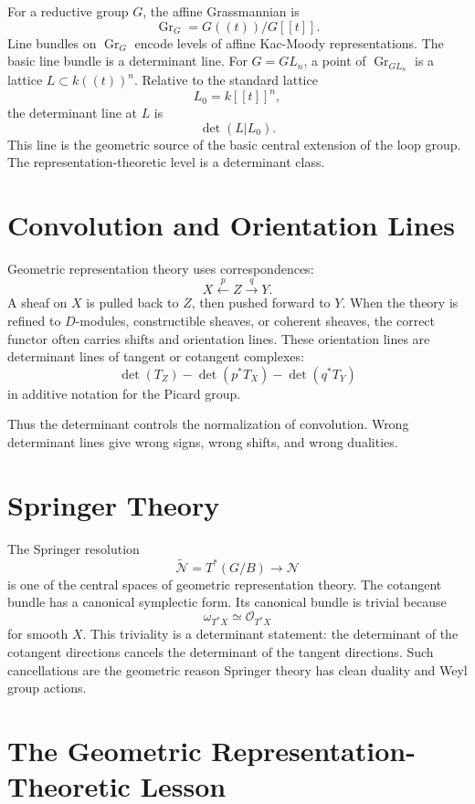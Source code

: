 \documentclass[11pt]{memoir}
\newcommand{\cO}{\mathcal{O}}
\begin{document}
For a reductive group \(G\), the affine Grassmannian is
\[
  \operatorname{Gr}_G=G((t))/G[[t]].
\]
Line bundles on \(\operatorname{Gr}_G\) encode levels of affine
Kac-Moody representations. The basic line bundle is a determinant
line. For \(G=GL_n\), a point of \(\operatorname{Gr}_{GL_n}\) is a
lattice \(L\subset k((t))^n\). Relative to the standard lattice
\[
  L_0=k[[t]]^n,
\]
the determinant line at \(L\) is
\[
  \det(L|L_0).
\]
This line is the geometric source of the basic central extension of
the loop group. The representation-theoretic level is a determinant
class.

\section{Convolution and Orientation Lines}
\label{sec:convolution}

Geometric representation theory uses correspondences:
\[
  X \xleftarrow{p} Z \xrightarrow{q} Y.
\]
A sheaf on \(X\) is pulled back to \(Z\), then pushed forward to \(Y\).
When the theory is refined to \(D\)-modules, constructible sheaves,
or coherent sheaves, the correct functor often carries shifts and
orientation lines. These orientation lines are determinant lines of
tangent or cotangent complexes:
\[
  \det(T_Z)-\det(p^*T_X)-\det(q^*T_Y)
\]
in additive notation for the Picard group.

Thus the determinant controls the normalization of convolution. Wrong
determinant lines give wrong signs, wrong shifts, and wrong dualities.

\section{Springer Theory}
\label{sec:springer}

The Springer resolution
\[
  \widetilde{\mathcal N}=T^*(G/B)\to\mathcal N
\]
is one of the central spaces of geometric representation theory. The
cotangent bundle has a canonical symplectic form. Its canonical bundle
is trivial because
\[
  \omega_{T^*X}\simeq \cO_{T^*X}
\]
for smooth \(X\). This triviality is a determinant statement: the
determinant of the cotangent directions cancels the determinant of
the tangent directions. Such cancellations are the geometric reason
Springer theory has clean duality and Weyl group actions.

\section{The Geometric Representation-Theoretic Lesson}
\label{sec:grt-lesson}
\end{document}
